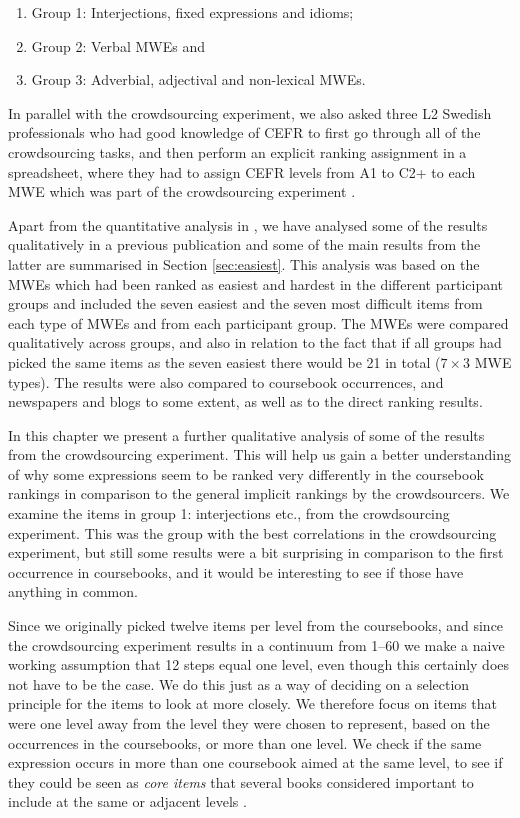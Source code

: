 \documentclass[output=paper,colorlinks,citecolor=brown]{langscibook}
\begin{document}
\begin{enumerate}
    \item Group 1: Interjections, fixed expressions and idioms; 
    \item Group 2: Verbal MWEs and 
    \item Group 3: Adverbial, adjectival and non-lexical MWEs. 
\end{enumerate}

\begin{sloppypar}
In parallel with the crowdsourcing experiment, we also asked three L2 Swedish professionals who had good knowledge of CEFR to first go through all of the crowdsourcing tasks, and then perform an explicit ranking assignment in a    
spreadsheet, where they had to assign CEFR levels from A1 to C2+ to each MWE which was part of the crowdsourcing experiment \citep{alfter2021mwe}.
\end{sloppypar}

Apart from the quantitative analysis in \citet{alfter2021mwe}, we have analysed some of the results qualitatively in a previous publication \citep[][]{lindstrom2022MWE}{}{} and some of the main results from the latter are summarised in Section \ref{sec:easiest}. This analysis was based on the MWEs which had been ranked as easiest and hardest in the different participant groups and included the seven easiest and the seven most difficult items from each type of MWEs and from each participant group. The MWEs were compared qualitatively across groups, and also in relation to the fact that if all groups had picked the same items as the seven easiest there would be 21 in total ($7 \times 3$ MWE types). The results were also compared to coursebook occurrences, and newspapers and blogs to some extent, as well as to the direct ranking results. 

In this chapter we present a further 
qualitative analysis of some of the results from the crowdsourcing experiment.
This will help us gain a better understanding of why some expressions seem to be ranked very differently in the coursebook rankings in comparison to the general implicit rankings by the crowdsourcers. We examine the items in group 1: interjections etc., from the crowdsourcing experiment. This was the group with the best correlations in the crowdsourcing experiment, but still some results were a bit surprising in comparison to the first occurrence in coursebooks, and 
it would be interesting to see if those have anything in common.

Since we originally picked twelve items per level from the coursebooks, and since the crowdsourcing experiment results in a continuum from 1–60 we make a naive working assumption that 12 steps equal one level, even though this certainly does not have to be the case. We do this just as a way of deciding on a selection principle for the items to look at more closely. We therefore focus on items that were one level away from the level they were chosen to represent, based on the occurrences in the coursebooks, or more than one level. We check if the same expression occurs in more than one coursebook aimed at the same level, to see if they could be seen as \textit{core items} that several books considered important to include at the same or adjacent levels \citep[][]{volodina2022single}. 
\end{document}

